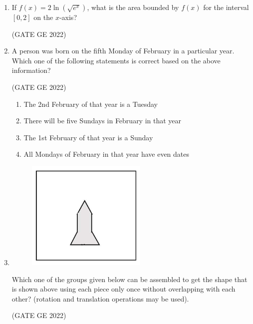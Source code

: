 \documentclass[journal,12pt,onecolumn]{IEEEtran}
\theoremstyle{remark}
\begin{document}
\begin{enumerate}
\item If $f(x) = 2 \ln(\sqrt{e^x})$, what is the area bounded by $f(x)$ for the interval $[0, 2]$ on the $x$-axis?

\hfill (GATE GE 2022)

\begin{enumerate}
\end{enumerate}

\item A person was born on the fifth Monday of February in a particular year. Which one of the following statements is correct based on the above information?

\hfill (GATE GE 2022)

\begin{enumerate}
    \item The 2nd February of that year is a Tuesday
    \item There will be five Sundays in February in that year
    \item The 1st February of that year is a Sunday
    \item All Mondays of February in that year have even dates
\end{enumerate}

\item
\begin{figure}[H]
    \centering
    \includegraphics[width=0.3\columnwidth]{figs/fig_5.png}
    \label{fig:question5}
\end{figure}
Which one of the groups given below can be assembled to get the shape that is shown above using each piece only once without overlapping with each other? (rotation and translation operations may be used).

\hfill (GATE GE 2022)


\end{enumerate}
\end{document}
